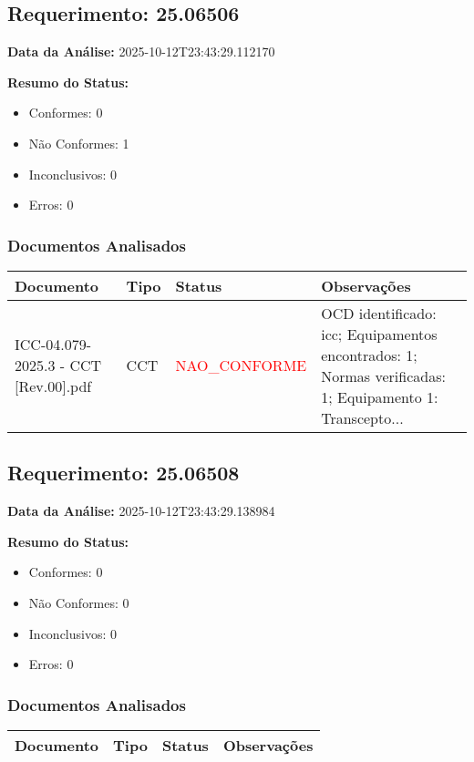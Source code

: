 \documentclass[12pt,a4paper]{article}
\begin{document}
\subsection{Requerimento: 25.06506}

\textbf{Data da Análise:} 2025-10-12T23:43:29.112170

\textbf{Resumo do Status:}
\begin{itemize}
    \item Conformes: 0
    \item Não Conformes: 1
    \item Inconclusivos: 0
    \item Erros: 0
\end{itemize}

\subsubsection{Documentos Analisados}

\begin{longtable}{|p{4cm}|p{2cm}|p{2cm}|p{6cm}|}
\hline
\textbf{Documento} & \textbf{Tipo} & \textbf{Status} & \textbf{Observações} \\
\hline
\endhead
ICC-04.079-2025.3 - CCT [Rev.00].pdf & CCT & \textcolor{red}{NAO\_CONFORME} & OCD identificado: icc; Equipamentos encontrados: 1; Normas verificadas: 1; Equipamento 1: Transcepto... \\
\hline
\end{longtable}


\subsection{Requerimento: 25.06508}

\textbf{Data da Análise:} 2025-10-12T23:43:29.138984

\textbf{Resumo do Status:}
\begin{itemize}
    \item Conformes: 0
    \item Não Conformes: 0
    \item Inconclusivos: 0
    \item Erros: 0
\end{itemize}

\subsubsection{Documentos Analisados}

\begin{longtable}{|p{4cm}|p{2cm}|p{2cm}|p{6cm}|}
\hline
\textbf{Documento} & \textbf{Tipo} & \textbf{Status} & \textbf{Observações} \\
\hline
\endhead
\end{longtable}
\end{document}
